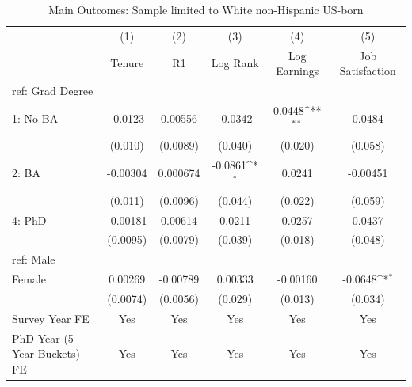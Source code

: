 \begin{table}[htbp]\centering
\def\sym#1{\ifmmode^{#1}\else\(^{#1}\)\fi}
\caption{Main Outcomes: Sample limited to White non-Hispanic US-born \label{tab1}}
\begin{tabular}{l*{5}{c}}
\hline\hline
  &\multicolumn{1}{c}{(1)}&\multicolumn{1}{c}{(2)}&\multicolumn{1}{c}{(3)}&\multicolumn{1}{c}{(4)}&\multicolumn{1}{c}{(5)}\\
  &\multicolumn{1}{c}{Tenure}&\multicolumn{1}{c}{R1}&\multicolumn{1}{c}{Log Rank}&\multicolumn{1}{c}{Log Earnings}&\multicolumn{1}{c}{Job Satisfaction}\\
\hline
ref: Grad Degree&                     &                     &                     &                     &                     \\
[1em]
1: No BA&     -0.0123         &     0.00556         &     -0.0342         &      0.0448\sym{**} &      0.0484         \\
  &     (0.010)         &    (0.0089)         &     (0.040)         &     (0.020)         &     (0.058)         \\
[1em]
2: BA&    -0.00304         &    0.000674         &     -0.0861\sym{*}  &      0.0241         &    -0.00451         \\
  &     (0.011)         &    (0.0096)         &     (0.044)         &     (0.022)         &     (0.059)         \\
[1em]
4: PhD&    -0.00181         &     0.00614         &      0.0211         &      0.0257         &      0.0437         \\
  &    (0.0095)         &    (0.0079)         &     (0.039)         &     (0.018)         &     (0.048)         \\
[1em]
ref: Male&                     &                     &                     &                     &                     \\
[1em]
Female&     0.00269         &    -0.00789         &     0.00333         &    -0.00160         &     -0.0648\sym{*}  \\
  &    (0.0074)         &    (0.0056)         &     (0.029)         &     (0.013)         &     (0.034)         \\
[1em]
Survey Year FE&         Yes         &         Yes         &         Yes         &         Yes         &         Yes         \\
[1em]
PhD Year (5-Year Buckets) FE&         Yes         &         Yes         &         Yes         &         Yes         &         Yes         \\

\end{tabular}
\end{table}
